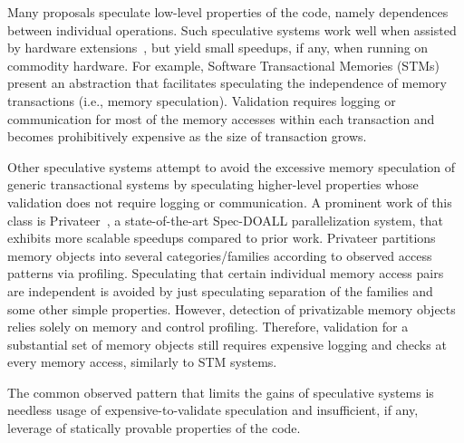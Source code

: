 Many proposals speculate low-level properties of the code, namely dependences
between individual operations.
%
Such speculative systems work well when assisted by hardware
extensions~\cite{TLS papers...}, but yield small speedups, if any, when
running on commodity hardware.
For example, Software Transactional Memories
(STMs)~\cite{mehrara:09:stmlite} present an abstraction that facilitates
speculating the independence of memory transactions (i.e., memory
speculation). Validation requires logging or communication for most of the
memory accesses within each transaction and becomes prohibitively expensive
as the size of transaction grows.
%

Other speculative systems attempt to avoid the excessive memory speculation of
generic transactional systems by speculating higher-level properties whose
validation does not require logging or communication.
%
A prominent work of this class is Privateer~\cite{johnson:12:pldi:short}, a
state-of-the-art Spec-DOALL parallelization system, that exhibits more
scalable speedups compared to prior work.
%
Privateer partitions memory objects into several categories/families according
to observed access patterns via profiling.  Speculating that certain
individual memory access pairs are independent is avoided by just speculating
separation of the families and some other simple properties.  However, detection
of privatizable memory objects relies solely on memory and control profiling.
Therefore, validation for a substantial set of memory objects still requires
expensive logging and checks at every memory access, similarly to STM systems.
%

The common observed pattern that limits the gains of speculative systems is
needless usage of expensive-to-validate speculation and insufficient, if any,
leverage of statically provable properties of the code.

